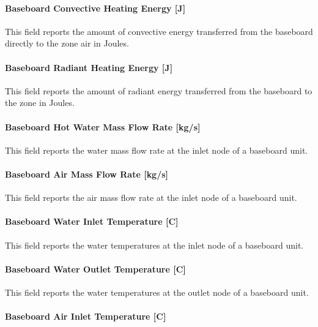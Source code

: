 \paragraph{Baseboard Convective Heating Energy {[}J{]}}\label{baseboard-convective-heating-energy-j-000}

This field reports the amount of convective energy transferred from the baseboard directly to the zone air in Joules.

\paragraph{Baseboard Radiant Heating Energy {[}J{]}}\label{baseboard-radiant-heating-energy-j-000}

This field reports the amount of radiant energy transferred from the baseboard to the zone in Joules.

\paragraph{Baseboard Hot Water Mass Flow Rate {[}kg/s{]}}\label{baseboard-hot-water-mass-flow-rate-kgs}

This field reports the water mass flow rate at the inlet node of a baseboard unit.

\paragraph{Baseboard Air Mass Flow Rate {[}kg/s{]}}\label{baseboard-air-mass-flow-rate-kgs}

This field reports the air mass flow rate at the inlet node of a baseboard unit.

\paragraph{Baseboard Water Inlet Temperature {[}C{]}}\label{baseboard-water-inlet-temperature-c}

This field reports the water temperatures at the inlet node of a baseboard unit.

\paragraph{Baseboard Water Outlet Temperature {[}C{]}}\label{baseboard-water-outlet-temperature-c}

This field reports the water temperatures at the outlet node of a baseboard unit.

\paragraph{Baseboard Air Inlet Temperature {[}C{]}}\label{baseboard-air-inlet-temperature-c}

